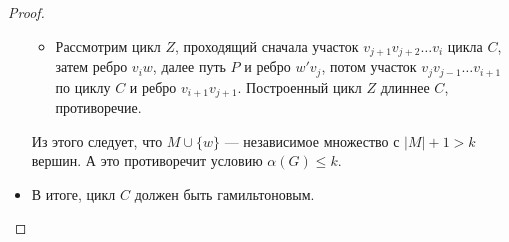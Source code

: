\begin{proof}
\begin{itemize}
\begin{itemize}
				\item Рассмотрим цикл $Z$, проходящий сначала участок $v_{j+1}v_{j+2}\ldots v_i$ цикла $C$, затем ребро  $v_iw$, далее путь $P$ и ребро $w'v_j$, потом участок $v_jv_{j-1}\ldots v_{i+1}$ по циклу $C$ и ребро $v_{i+1}v_{j+1}$. Построенный цикл $Z$ длиннее $C$, противоречие.
			\end{itemize}
			Из этого следует, что $M \cup \{w\}$ --- независимое множество с $\lvert M \rvert + 1 > k$ вершин. А это противоречит условию $\alpha(G) \le k$. 
		\item В итоге, цикл $C$ должен быть гамильтоновым.
    \end{itemize}
\end{proof}
